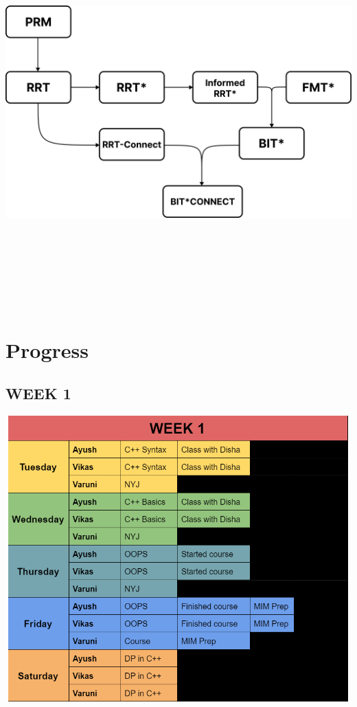 \documentclass[12pt]{report}
\begin{document}
\includegraphics[height=15cm,width = 15cm]{Flow.png}




\chapter{Progress}

\section{WEEK 1}
\includegraphics[height=11cm,width = 15cm]{week1.png}
\end{document}
